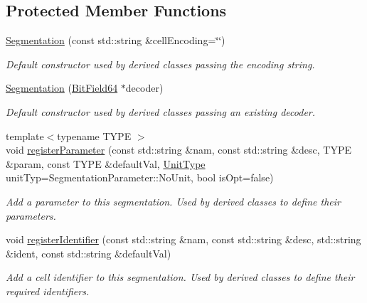 \subsection*{Protected Member Functions}
\begin{DoxyCompactItemize}
\item 
\hyperlink{class_d_d4hep_1_1_d_d_segmentation_1_1_segmentation_a52364d20f9930e867d682ad453900e65}{Segmentation} (const std::string \&cellEncoding=\char`\"{}\char`\"{})
\begin{DoxyCompactList}\small\item\em Default constructor used by derived classes passing the encoding string. \item\end{DoxyCompactList}\item 
\hyperlink{class_d_d4hep_1_1_d_d_segmentation_1_1_segmentation_a2c565cf9552a24845ed91c686fc63f40}{Segmentation} (\hyperlink{class_d_d4hep_1_1_d_d_segmentation_1_1_bit_field64}{BitField64} $\ast$decoder)
\begin{DoxyCompactList}\small\item\em Default constructor used by derived classes passing an existing decoder. \item\end{DoxyCompactList}\item 
{\footnotesize template$<$typename TYPE $>$ }\\void \hyperlink{class_d_d4hep_1_1_d_d_segmentation_1_1_segmentation_a7f7f6557bb76cf4726b09a4199922f97}{registerParameter} (const std::string \&nam, const std::string \&desc, TYPE \&param, const TYPE \&defaultVal, \hyperlink{class_d_d4hep_1_1_d_d_segmentation_1_1_segmentation_parameter_a36f5f8b8d812b2a2b81363377565d8d4}{UnitType} unitTyp=SegmentationParameter::NoUnit, bool isOpt=false)
\begin{DoxyCompactList}\small\item\em Add a parameter to this segmentation. Used by derived classes to define their parameters. \item\end{DoxyCompactList}\item 
void \hyperlink{class_d_d4hep_1_1_d_d_segmentation_1_1_segmentation_ab513ba2af3efb21c7ca2e17c6829aeca}{registerIdentifier} (const std::string \&nam, const std::string \&desc, std::string \&ident, const std::string \&defaultVal)
\begin{DoxyCompactList}\small\item\em Add a cell identifier to this segmentation. Used by derived classes to define their required identifiers. \item\end{DoxyCompactList}\end{DoxyCompactItemize}
